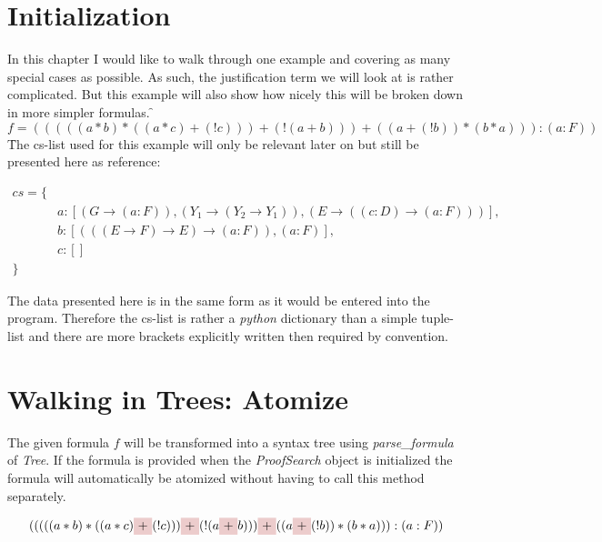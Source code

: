 \section{Initialization}
In this chapter I would like to walk through one example and covering as many special cases as possible. As such, the justification term we will look at is rather complicated. But this example will also show how nicely this will be broken down in more simpler formulas.
\newsavebox\f

\savebox\f{\vbox{\begin{equation}
f = (((((a*b)*((a*c)+(!c)))+(!(a+b)))+((a+(!b))*(b*a))):(a:F))	
\end{equation}}}
\usebox\f

The cs-list used for this example will only be relevant later on but still be presented here as reference:


\begin{equation}
\begin{split}
	cs = \{\\
	& a: [(G \rightarrow (a:F)), (Y_1 \rightarrow (Y_2 \rightarrow Y_1)), (E \rightarrow ((c:D) \rightarrow (a:F)))],\\
	& b: [(((E \rightarrow F) \rightarrow E) \rightarrow (a:F)), (a:F)],\\
	& c: [] \\
	\}
\end{split}
\end{equation}

The data presented here is in the same form as it would be entered into the program. Therefore the cs-list is rather a \emph{python} dictionary than a simple tuple-list and there are more brackets explicitly written then required by convention.


\section{Walking in Trees: Atomize}

The given formula $f$ will be transformed into a syntax tree using \emph{parse\_formula} of \emph{Tree}. If the formula is provided when the \emph{ProofSearch} object is initialized the formula will automatically be atomized without having to call this method separately.

\begin{equation*}
	(((((a*b)*((a*c)
    \tikz[baseline]{\node[fill=red!20,anchor=base] (t1){$+$};} (!c)))
    \tikz[baseline]{\node[fill=red!20,anchor=base] (t2){$+$};} (!(a
    \tikz[baseline]{\node[fill=red!20,anchor=base] (t3){$+$};} b)))
    \tikz[baseline]{\node[fill=red!20,anchor=base] (t3){$+$};}((a
    \tikz[baseline]{\node[fill=red!20,anchor=base] (t3){$+$};}(!b))*(b*a))):(a:F))
\end{equation*}

